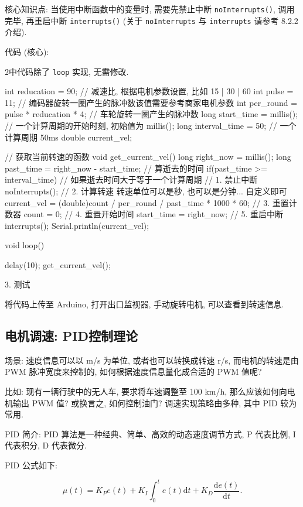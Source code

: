 \documentclass[openany, fontset=windowsold]{ctexbook}
\theoremstyle{kaiti}
\theoremstyle{normal}
\begin{document}
核心知识点: 当使用中断函数中的变量时, 需要先禁止中断 \verb|noInterrupts()|, 调用完毕, 再重启中断 \verb|interrupts()| (关于 \verb|noInterrupts| 与 \verb|interrupts| 请参考 8.2.2 介绍).

代码 (核心):

2中代码除了 \verb|loop| 实现, 无需修改.

\begin{cpp}
  int reducation = 90; // 减速比, 根据电机参数设置, 比如 15 | 30 | 60
  int pulse = 11; // 编码器旋转一圈产生的脉冲数该值需要参考商家电机参数
  int per_round = pulse * reducation * 4; // 车轮旋转一圈产生的脉冲数 
  long start_time = millis(); // 一个计算周期的开始时刻, 初始值为 millis();
  long interval_time = 50; // 一个计算周期 50ms
  double current_vel;

  // 获取当前转速的函数
  void get_current_vel(){
    long right_now = millis();  
    long past_time = right_now - start_time; // 算逝去的时间
    if(past_time >= interval_time){ // 如果逝去时间大于等于一个计算周期
      // 1. 禁止中断
      noInterrupts();
      // 2. 计算转速 转速单位可以是秒, 也可以是分钟... 自定义即可
      current_vel = (double)count / per_round / past_time * 1000 * 60;
      // 3. 重置计数器
      count = 0;
      // 4. 重置开始时间
      start_time = right_now;
      // 5. 重启中断
      interrupts();
      Serial.println(current_vel);
    }
  }

  void loop() {
    delay(10);
    get_current_vel();

  }
\end{cpp}

3. 测试

将代码上传至 Arduino, 打开出口监视器, 手动旋转电机, 可以查看到转速信息.

\subsection{电机调速: PID控制理论}

场景: 速度信息可以以 m/s 为单位, 或者也可以转换成转速 r/s, 而电机的转速是由 PWM 脉冲宽度来控制的, 如何根据速度信息量化成合适的 PWM 值呢? 

比如: 现有一辆行驶中的无人车, 要求将车速调整至 100 km/h, 那么应该如何向电机输出 PWM 值? 或换言之, 如何控制油门? 调速实现策略由多种, 其中 PID 较为常用.

PID 简介: PID 算法是一种经典、简单、高效的动态速度调节方式, P 代表比例, I 代表积分, D 代表微分.

PID 公式如下: 

\begin{equation}
  \mu(t)=K_P e(t)+K_I\int_{0}^{t}e(t)\mathrm{d}t+K_D\frac{\mathrm{d}e(t)}{\mathrm{d}t}.
\end{equation}
\end{document}

